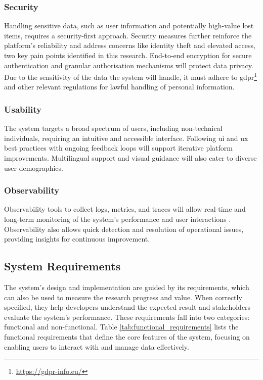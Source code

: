 \subsubsection{Security}

Handling sensitive data, such as user information and potentially high-value lost items, requires a security-first approach. Security measures further reinforce the platform's reliability and address concerns like identity theft and elevated access, two key pain points identified in this research. End-to-end encryption for secure authentication and granular authorisation mechanisms will protect data privacy. Due to the sensitivity of the data the system will handle, it must adhere to \ac{gdpr}\footnote{\url{https://gdpr-info.eu/}} and other relevant regulations for lawful handling of personal information.

\subsubsection{Usability}

The system targets a broad spectrum of users, including non-technical individuals, requiring an intuitive and accessible interface. Following \ac{ui} and \ac{ux} best practices with ongoing feedback loops will support iterative platform improvements. Multilingual support and visual guidance will also cater to diverse user demographics.

\subsubsection{Observability}

Observability tools to collect logs, metrics, and traces will allow real-time and long-term monitoring of the system's performance and user interactions \cite{Niedermaier2023}. Observability also allows quick detection and resolution of operational issues, providing insights for continuous improvement.


\subsection{System Requirements} \label{section:requirements}

The system's design and implementation are guided by its requirements, which can also be used to measure the research progress and value. When correctly specified, they help developers understand the expected result and stakeholders evaluate the system's performance. These requirements fall into two categories: functional and non-functional. Table \ref{tab:functional_requirements} lists the functional requirements that define the core features of the system, focusing on enabling users to interact with and manage data effectively.

